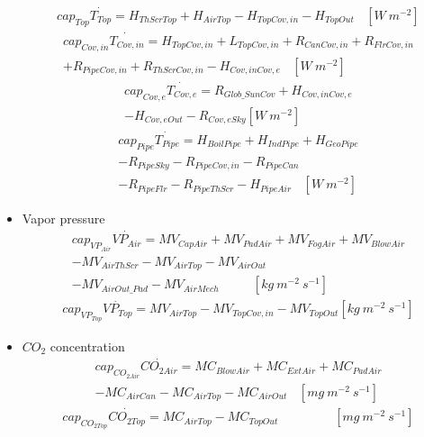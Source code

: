 \documentclass[a4paper]{article}
\numberwithin{equation}{section}
\begin{document}
\begin{itemize}
\begin{multline*}
        \end{multline*}
        \begin{multline*}
          cap_{Top}\dot{T_{Top}} = H_{ThScrTop} + H_{AirTop} - H_{TopCov,in} - H_{TopOut} ~~~~ [W\ m^{-2}]
        \end{multline*}
        \begin{multline*}
          cap_{Cov,in}\dot{T_{Cov,in}} = H_{TopCov,in} + L_{TopCov,in} + R_{CanCov,in} + R_{FlrCov,in} \\
          + R_{PipeCov,in} + R_{ThScrCov,in} - H_{Cov,inCov,e} ~~~~ [W\ m^{-2}]
        \end{multline*}
        \begin{multline*}
          cap_{Cov,e}\dot{T_{Cov,e}} = R_{Glob\_SunCov} + H_{Cov,inCov,e} \\
          - H_{Cov,eOut} - R_{Cov,eSky} [W\ m^{-2}]
        \end{multline*}
        \begin{multline*}
          cap_{Pipe}\dot{T_{Pipe}} = H_{BoilPipe} + H_{IndPipe} + H_{GeoPipe} \\
          - R_{PipeSky} - R_{PipeCov,in} - R_{PipeCan} \\
          - R_{PipeFlr} - R_{PipeThScr} - H_{PipeAir} ~~~~ [W\ m^{-2}]
        \end{multline*}
  \item Vapor pressure
        \begin{multline*}
          cap_{VP_{Air}}\dot{VP_{Air}} = MV_{CapAir} + MV_{PadAir} + MV_{FogAir} + MV_{BlowAir} \\
          - MV_{AirThScr} - MV_{AirTop} - MV_{AirOut} \\
          - MV_{AirOut\_Pad} - MV_{AirMech} ~~~~~~~~~~~~ [kg\ m^{-2}\ s^{-1}]
        \end{multline*}
        \begin{multline*}
          cap_{VP_{Top}}\dot{VP_{Top}} = MV_{AirTop} - MV_{TopCov,in} - MV_{TopOut} [kg\ m^{-2}\ s^{-1}]
        \end{multline*}
  \item \(CO_2\) concentration
        \begin{multline*}
          cap_{CO_{2Air}}\dot{CO_{2Air}} = MC_{BlowAir} + MC_{ExtAir} + MC_{PadAir} \\
          - MC_{AirCan} - MC_{AirTop} - MC_{AirOut} ~~~~ [mg\ m^{-2}\ s^{-1}]
        \end{multline*}
        \begin{multline*}
          cap_{CO_{2Top}}\dot{CO_{2Top}} = MC_{AirTop} - MC_{TopOut} ~~~~~~~~~~~~~~~~~~~~ [mg\ m^{-2}\ s^{-1}]
        \end{multline*}
\end{itemize}
\end{document}
